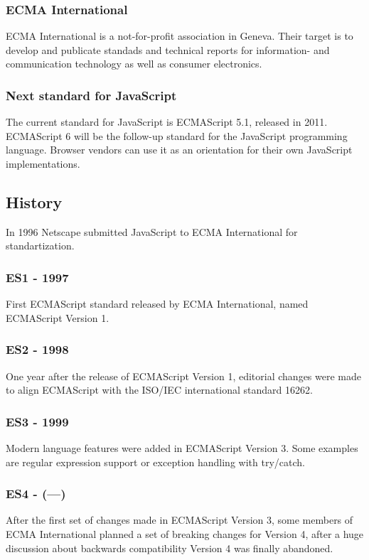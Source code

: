 \documentclass{bioinfo}
\begin{document}
\subsubsection{ECMA International}
ECMA International is a not-for-profit association in Geneva. 
Their target is to develop and publicate standads and technical reports for information- and
communication technology as well as consumer electronics. 
\subsubsection{Next standard for JavaScript}
The current standard for JavaScript is ECMAScript 5.1, released in 2011. 
ECMAScript 6 will be the follow-up standard for the JavaScript programming language.
Browser vendors can use it as an orientation for their own JavaScript implementations.

\subsection{History}
In 1996 Netscape submitted JavaScript to ECMA International for standartization.
\subsubsection*{\textbf{ES1 - 1997}}
First ECMAScript standard released by ECMA International, named ECMAScript Version 1.
\subsubsection*{\textbf{ES2 - 1998}}
One year after the release of ECMAScript Version 1, editorial changes were made to align ECMAScript with the ISO/IEC international standard 16262.
\subsubsection*{\textbf{ES3 - 1999}}
Modern language features were added in ECMAScript Version 3. Some examples are regular expression support or exception handling with try/catch.
\subsubsection*{\textbf{ES4 - (---)}}After the first set of changes made in ECMAScript Version 3, some members of ECMA International planned a set of breaking changes for Version 4, after a huge discussion about backwards compatibility Version 4 was finally abandoned. 
\end{document}
